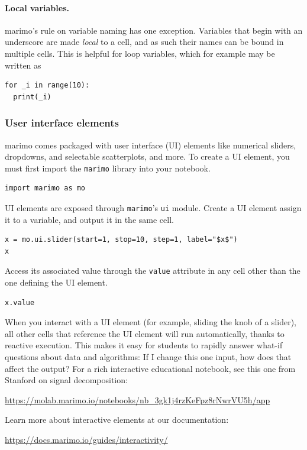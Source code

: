 \documentclass{article}
\begin{document}
\paragraph{Local variables.} marimo's rule on variable naming has one exception. Variables that begin with
an underscore are made \emph{local} to a cell, and as such their names can be
bound in multiple cells. This is helpful for loop variables, which for
example may be written as
\begin{lstlisting}
for _i in range(10):
  print(_i)
\end{lstlisting}

\subsubsection{User interface elements} marimo comes packaged with user interface
(UI) elements like numerical sliders, dropdowns, and selectable scatterplots,
and more. To create a UI element, you must first import the \verb|marimo|
library into your notebook.
\begin{lstlisting}
import marimo as mo
\end{lstlisting}

UI elements are exposed through \verb|marimo|'s \verb|ui| module. Create a UI element
assign it to a variable, and output it in the same cell.
\begin{lstlisting}
x = mo.ui.slider(start=1, stop=10, step=1, label="$x$")
x
\end{lstlisting}
Access its associated value through the \verb|value| attribute in any cell
other than the one defining the UI element.
\begin{lstlisting}
x.value
\end{lstlisting}
When you interact with a UI element (for example, sliding the knob of a slider), all other
cells that reference the UI element will run automatically, thanks to reactive execution.
This makes it easy for students to rapidly answer what-if questions about data
and algorithms: If I change this one input, how does that affect the output?
For a rich interactive educational notebook, see this one from Stanford
on signal decomposition:

\begin{center}
  \url{https://molab.marimo.io/notebooks/nb_3gk1j4rzKeFpz8rNwrVU5h/app}
\end{center}

Learn more about interactive elements at our documentation:
\begin{center}
  \url{https://docs.marimo.io/guides/interactivity/}
\end{center}
\end{document}
